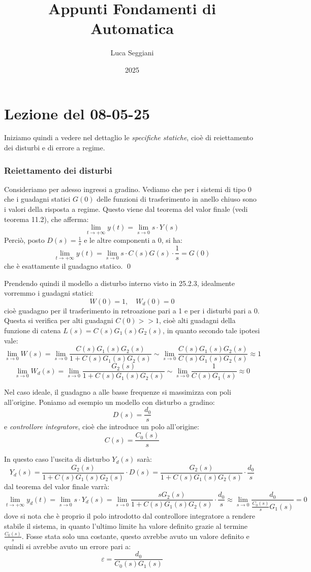 \documentclass[a4paper,11pt]{article}
\title{Appunti Fondamenti di Automatica}
\author{Luca Seggiani}
\date{2025}
\begin{document}
\section{Lezione del 08-05-25}

\thispagestyle{empty}
\pagestyle{fancy}

Iniziamo quindi a vedere nel dettaglio le \textit{specifiche statiche}, cioè di reiettamento dei disturbi e di errore a regime.

\subsubsection{Reiettamento dei disturbi}
Consideriamo per adesso ingressi a gradino.
Vediamo che per i sistemi di tipo 0 che i guadagni statici $G(0)$ delle funzioni di trasferimento in anello chiuso sono i valori della risposta a regime.
Questo viene dal teorema del valor finale (vedi teorema 11.2), che afferma:
$$
\lim_{t \rightarrow +\infty} y(t) = \lim_{s \rightarrow 0} s \cdot Y(s)
$$
Perciò, posto $D(s) = \frac{1}{s}$ e le altre componenti a 0, si ha:
$$
\lim_{t \rightarrow +\infty} y(t) = \lim_{s \rightarrow 0} s \cdot C(s) G(s) \cdot \frac{1}{s} = G(0)
$$
che è esattamente il guadagno statico. \qed

Prendendo quindi il modello a disturbo interno visto in 25.2.3, idealmente vorremmo i guadagni statici:
$$
W(0) = 1, \quad W_d(0) =0
$$
cioè guadagno per il trasferimento in retroazione pari a 1 e per i disturbi pari a 0.
Questa si verifica per alti guadagni $C(0) >> 1$, cioè alti guadagni della funzione di catena $L(s) = C(s) G_1(s) G_2(s)$, in quanto secondo tale ipotesi vale:
$$
\lim_{s \rightarrow 0} W(s) = \lim_{s \rightarrow 0} \frac{C(s) G_1(s) G_2(s)}{1 + C(s) G_1(s) G_2(s)} \sim  \lim_{s \rightarrow 0} \frac{C(s) G_1(s) G_2(s)}{C(s) G_1(s) G_2(s)} \approx 1
$$
$$
\lim_{s \rightarrow 0} W_d(s) = \lim_{s \rightarrow 0} \frac{G_2(s)}{1 + C(s) G_1(s) G_2(s)} \sim \lim_{s \rightarrow 0} \frac{1}{C(s) G_1(s)} \approx 0
$$

Nel caso ideale, il guadagno a alle basse frequenze si massimizza con poli all'origine.
Poniamo ad esempio un modello con disturbo a gradino:
$$
D(s) = \frac{d_0}{s}
$$
e \textit{controllore integratore}, cioè che introduce un polo all'origine:
$$
C(s) = \frac{C_0(s)}{s}
$$

In questo caso l'uscita di disturbo $Y_d(s)$ sarà:
$$
Y_d(s) = \frac{G_2(s)}{1 + C(s) G_1(s) G_2(s)} \cdot D(s) = \frac{G_2(s)}{1 + C(s) G_1(s) G_2(s)} \cdot \frac{d_0}{s}
$$
dal teorema del valor finale varrà:
$$
\lim_{t \rightarrow + \infty} y_d(t) = \lim_{s \rightarrow 0} s \cdot Y_d(s) = \lim_{s \rightarrow 0} \frac{s G_2(s)}{1 + C(s) G_1(s) G_2(s)} \cdot \frac{d_0}{s} \approx \lim_{s \rightarrow 0} \frac{d_0}{ \frac{C_0(s)}{s} G_1(s) } = 0
$$
dove si nota che è proprio il polo introdotto dal controllore integratore a rendere stabile il sistema, in quanto l'ultimo limite ha valore definito grazie al termine $\frac{C_0(s)}{s}$. 
Fosse stata solo una costante, questo avrebbe avuto un valore definito e quindi si avrebbe avuto un errore pari a:
$$
\varepsilon = \frac{d_0}{C_0(s) G_1(s)}
$$
\end{document}

